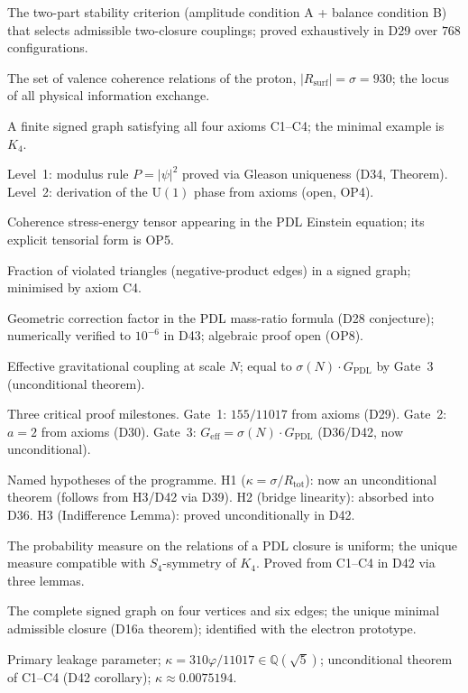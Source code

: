 \documentclass[11pt,a4paper]{article}
\theoremstyle{plain}
\theoremstyle{definition}
\theoremstyle{remark}
\newcommand{\Geff}{G_{\mathrm{eff}}}
\newcommand{\GPDL}{G_{\mathrm{PDL}}}
\newcommand{\Rsurf}{R_{\mathrm{surf}}}
\newcommand{\sigmaN}{\sigma(N)}
\newcommand{\epsGeomB}{\varepsilon_G^B}
\begin{document}
\begin{description}[leftmargin=3.5cm, style=nextline]
\item[AB criterion] The two-part stability criterion (amplitude condition A + balance condition B) that selects admissible two-closure couplings; proved exhaustively in D29 over $768$ configurations.
\item[Active surface $\Rsurf$] The set of valence coherence relations of the proton, $|\Rsurf|=\sigma=930$; the locus of all physical information exchange.
\item[Admissible closure] A finite signed graph satisfying all four axioms C1--C4; the minimal example is $K_4$.
\item[Born Level~1 / Level~2] Level~1: modulus rule $P=|\psi|^2$ proved via Gleason uniqueness (D34, Theorem). Level~2: derivation of the $\mathrm{U}(1)$ phase from axioms (open, OP4).
\item[$C_{\mathrm{coh}}$] Coherence stress-energy tensor appearing in the PDL Einstein equation; its explicit tensorial form is OP5.
\item[Coherence cost] Fraction of violated triangles (negative-product edges) in a signed graph; minimised by axiom C4.
\item[$\epsGeomB$] Geometric correction factor in the PDL mass-ratio formula (D28 conjecture); numerically verified to $10^{-6}$ in D43; algebraic proof open (OP8).
\item[$\Geff(N)$] Effective gravitational coupling at scale $N$; equal to $\sigmaN\cdot\GPDL$ by Gate~3 (unconditional theorem).
\item[Gate 1, 2, 3] Three critical proof milestones. Gate~1: $155/11017$ from axioms (D29). Gate~2: $a=2$ from axioms (D30). Gate~3: $\Geff=\sigmaN\cdot\GPDL$ (D36/D42, now unconditional).
\item[H1, H2, H3] Named hypotheses of the programme. H1 ($\kappa=\sigma/R_{\mathrm{tot}}$): now an unconditional theorem (follows from H3/D42 via D39). H2 (bridge linearity): absorbed into D36. H3 (Indifference Lemma): proved unconditionally in D42.
\item[Indifference Lemma (H3)] The probability measure on the relations of a PDL closure is uniform; the unique measure compatible with $S_4$-symmetry of $K_4$. Proved from C1--C4 in D42 via three lemmas.
\item[$K_4$] The complete signed graph on four vertices and six edges; the unique minimal admissible closure (D16a theorem); identified with the electron prototype.
\item[$\kappa$] Primary leakage parameter; $\kappa=310\varphi/11017\in\mathbb{Q}(\sqrt{5})$; unconditional theorem of C1--C4 (D42 corollary); $\kappa\approx 0.0075194$.

\end{description}
\end{document}

